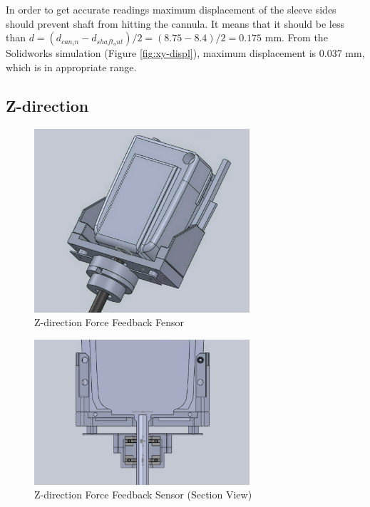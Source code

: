 In order to get accurate readings maximum displacement of the sleeve sides should prevent shaft from hitting the cannula. It means that it should be less than $d=(d_{can_in} - d_{shaft_out})/2 = (8.75 - 8.4)/2 = 0.175$ mm. From the Solidworks simulation (Figure \ref{fig:xy-displ}), maximum displacement is 0.037 mm, which is in appropriate range.

\subsection{Z-direction}
\label{sec:zDir}

\begin{figure}[h]
	\begin{center}
		\includegraphics[width=80mm]{fig/methods/z_dir_design.png}
	\end{center}
	\vspace{-4mm}
	\caption[Z-direction force feedback sensor]
	{Z-direction Force Feedback Fensor}
	\label{fig:Z-direction}
	\vspace{-2mm}
\end{figure}

\begin{figure}[h]
	\begin{center}
		\includegraphics[width=80mm]{fig/methods/z_dir_sec.png}
	\end{center}
	\vspace{-4mm}
	\caption[Z-direction force feedback sensor - section vew]
	{Z-direction Force Feedback Sensor (Section View)}
	\label{fig:Z-direction_sec}
	\vspace{-2mm}
\end{figure}


